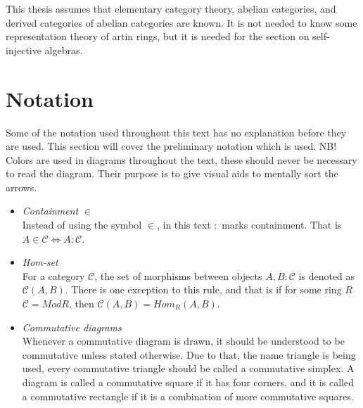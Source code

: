     This thesis assumes that elementary category theory, abelian categories, and derived categories of abelian categories are known. It is not needed to know some representation theory of artin rings, but it is needed for the section on self-injective algebras.
        
\chapter*{Notation}
    Some of the notation used throughout this text has no explanation before they are used. This section will cover the preliminary notation which is used. NB! Colors are used in diagrams throughout the text, these should never be necessary to read the diagram. Their purpose is to give visual aids to mentally sort the arrows.
    \begin{itemize}
        \item \emph{Containment} $\in$ \\
        Instead of using the symbol $\in$, in this text $:$ marks containment. That is $A\in\mathcal{C} \iff A:\mathcal{C}$.
        \item \emph{Hom-set} \\
        For a category $\mathcal{C}$, the set of morphisms between objects $A,B:\mathcal{C}$ is denoted as $\mathcal{C}(A,B)$. There is one exception to this rule, and that is if for some ring $R$ $\mathcal{C}=ModR$, then $\mathcal{C}(A,B)=Hom_R(A,B)$.
        \item \emph{Commutative diagrams} \\
        Whenever a commutative diagram is drawn, it should be understood to be commutative unless stated otherwise. Due to that, the name triangle is being used, every commutative triangle should be called a commutative simplex. A diagram is called a commutative square if it has four corners, and it is called a commutative rectangle if it is a combination of more commutative squares.
        \begin{center}
\end{center}
\end{itemize}
